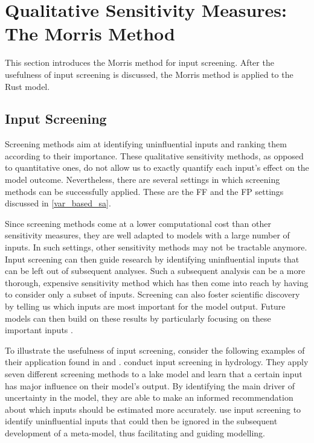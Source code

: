 \section{Qualitative Sensitivity Measures: The Morris Method} \label{comp_morris}

This section introduces the Morris method for input screening. After the usefulness of input screening is discussed, the Morris method is applied to the Rust model.

\subsection{Input Screening} \label{screening}

Screening methods aim at identifying uninfluential inputs and ranking them according to their importance. These qualitative sensitivity methods, as opposed to quantitative ones, do not allow us to exactly quantify each input's effect on the model outcome. Nevertheless, there are several settings in which screening methods can be successfully applied. These are the FF and the FP settings discussed in \cref{var_based_sa}.

Since screening methods come at a lower computational cost than other sensitivity measures, they are well adapted to models with a large number of inputs. In such settings, other sensitivity methods may not be tractable anymore. Input screening can then guide research by identifying uninfluential inputs that can be left out of subsequent analyses. Such a subsequent analysis can be a more thorough, expensive sensitivity method which has then come into reach by having to consider only a subset of inputs. Screening can also foster scientific discovery by telling us which inputs are most important for the model output. Future models can then build on these results by particularly focusing on these important inputs \citep{R21}.

To illustrate the usefulness of input screening, consider the following examples of their application found in \citet{GPWMS17} and \citet{MMA18}. \citet{GPWMS17} conduct input screening in hydrology. They apply seven different screening methods to a lake model and learn that a certain input has major influence on their model's output. By identifying the main driver of uncertainty in the model, they are able to make an informed recommendation about which inputs should be estimated more accurately. \citet{MMA18} use input screening to identify uninfluential inputs that could then be ignored in the subsequent development of a meta-model, thus facilitating and guiding modelling.

